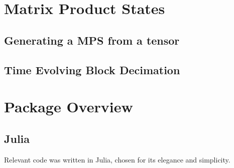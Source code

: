 \documentclass[12pt]{article}
\begin{document}
\begin{multicols}{2}
\section*{Matrix Product States}
	\subsection*{Generating a MPS from a tensor}
	\subsection*{Time Evolving Block Decimation}
\section*{Package Overview}
	\subsection*{Julia}
		Relevant code was written in Julia, chosen for its elegance and simplicity.


\end{multicols}

\end{document}
